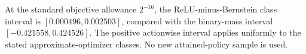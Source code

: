 At the standard objective allowance $2^{-16}$, the ReLU-minus-Bernstein class interval is $[0.000496, 0.002503]$, compared with the binary-mass interval $[-0.421558, 0.424526]$. The positive actionwise interval applies uniformly to the stated approximate-optimizer classes. No new attained-policy sample is used.
